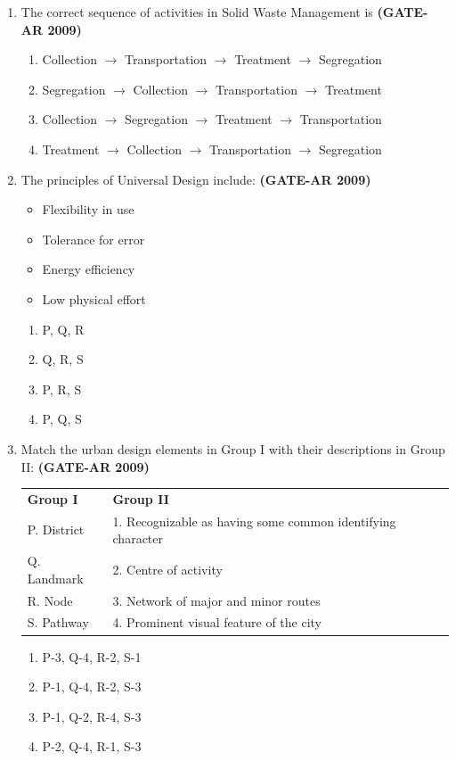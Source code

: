 \documentclass[a4paper,10pt]{article}
\begin{document}
\begin{enumerate}
	\item The correct sequence of activities in Solid Waste Management is \hfill \textbf{(GATE-AR 2009)}
    \begin{enumerate}
        \item Collection $\to$ Transportation $\to$ Treatment $\to$ Segregation
        \item Segregation $\to$ Collection $\to$ Transportation $\to$ Treatment
        \item Collection $\to$ Segregation $\to$ Treatment $\to$ Transportation
        \item Treatment $\to$ Collection $\to$ Transportation $\to$ Segregation
    \end{enumerate}
    
    \item The principles of Universal Design include: \hfill \textbf{(GATE-AR 2009)}
    \begin{itemize}
        \item Flexibility in use
        \item Tolerance for error
        \item Energy efficiency
        \item Low physical effort
    \end{itemize}
    \begin{multicols}{4}
	\begin{enumerate}
        \item P, Q, R
        \item Q, R, S
        \item P, R, S
        \item P, Q, S
    \end{enumerate}
	\end{multicols}
    
    \item Match the urban design elements in Group I with their descriptions in Group II: \hfill \textbf{(GATE-AR 2009)} \\
    \begin{tabular}{ l l }
	\textbf{Group I} & \textbf{Group II} \\
	P. District & 1. Recognizable as having some common identifying character \\
	Q. Landmark & 2. Centre of activity \\
	R. Node & 3. Network of major and minor routes \\
	S. Pathway & 4. Prominent visual feature of the city \\
	\end{tabular}
	\begin{multicols}{2}
	\begin{enumerate}
        \item P-3, Q-4, R-2, S-1
        \item P-1, Q-4, R-2, S-3
        \item P-1, Q-2, R-4, S-3
        \item P-2, Q-4, R-1, S-3
    \end{enumerate}
	\end{multicols}


\end{enumerate}
\end{document}
